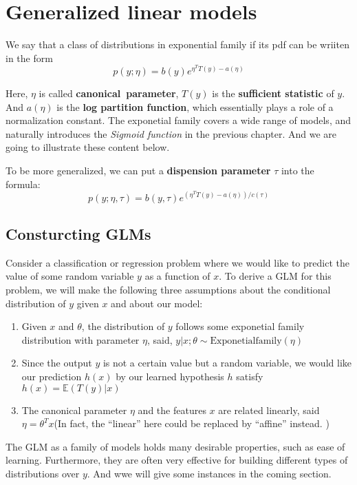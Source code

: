 \chapter{Generalized linear models}

\begin{define}
    We say that a class of distributions in exponential family if its pdf can be wriiten in the form
    \[p(y;\eta)=b(y)e^{\eta^TT(y)-a(\eta)}\]
\end{define}
Here, $\eta$ is called \textbf{canonical~parameter}, $T(y)$ is the \textbf{sufficient statistic} of $y$. And $a(\eta)$ is the \textbf{log partition function}, which essentially plays a role of a 
normalization constant. The exponetial family covers a wide range of models, and naturally introduces the \textit{Sigmoid function} in the previous chapter. And we are going to illustrate these content below.

To be more generalized, we can put a \textbf{dispension parameter} $\tau$ into the formula:
\[p(y;\eta,\tau)=b(y,\tau)e^{(\eta^TT(y)-a(\eta))/c(\tau)}\]

\section{Consturcting GLMs}

Consider a classification or regression problem where we would like to predict the value of some random variable $y$ as a function of $x$. To derive a GLM for this problem, we will make the following
three assumptions about the conditional distribution of $y$ given $x$ and about our model:
\begin{enumerate}
    \item Given $x$ and $\theta$, the distribution of $y$ follows some exponetial family distribution with parameter $\eta$, said, $y|x;\theta \sim \text{Exponetialfamily}(\eta)$
    \item Since the output $y$ is not a certain value but a random variable, we would like our prediction $h(x)$ by our learned hypothesis $h$ satisfy $h(x)=\mathbb{E}(T(y)|x)$
    \item The canonical parameter $\eta$ and the features $x$ are related linearly, said $\eta = \theta^Tx$(In fact, the ``linear'' here could be replaced by ``affine'' instead. )
\end{enumerate}

The GLM as a family of models holds many desirable properties, such as ease of learning. Furthermore, they are often very effective for building different types of distributions over $y$. And wwe will
give some instances in the coming section.

